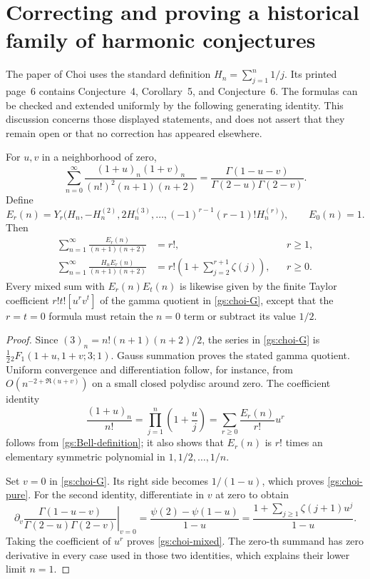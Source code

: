 \section{Correcting and proving a historical family of harmonic conjectures}
\label{gs:choi-section}

The paper of Choi \cite{gs:Choi} uses the standard definition
$H_n=\sum_{j=1}^n1/j$.  Its printed page~6 contains Conjecture~4,
Corollary~5, and Conjecture~6.  The formulas can be checked and extended
uniformly by the following generating identity.  This discussion
concerns those displayed statements, and does not assert that they
remain open or that no correction has appeared elsewhere.

\begin{theorem}
\label{gs:choi-master}
For $u,v$ in a neighborhood of zero,
\begin{equation}\label{gs:choi-G}
 \sum_{n=0}^{\infty}
 \frac{(1+u)_n(1+v)_n}{(n!)^2(n+1)(n+2)}
 =\frac{\Gamma(1-u-v)}{\Gamma(2-u)\Gamma(2-v)}.
\end{equation}
Define
\begin{equation}\label{gs:En}
 E_r(n)=Y_r\bigl(H_n,-H_n^{(2)},2H_n^{(3)},\ldots,
              (-1)^{r-1}(r-1)!H_n^{(r)}\bigr),\qquad E_0(n)=1.
\end{equation}
Then
\begin{align}
 \sum_{n=1}^{\infty}\frac{E_r(n)}{(n+1)(n+2)}
 &=r!,&&r\ge1,\label{gs:choi-pure}\\
 \sum_{n=1}^{\infty}\frac{H_nE_r(n)}{(n+1)(n+2)}
 &=r!\left(1+\sum_{j=2}^{r+1}\zeta(j)\right),&&r\ge0.
 \label{gs:choi-mixed}
\end{align}
Every mixed sum with $E_r(n)E_t(n)$ is likewise given by the finite
Taylor coefficient $r!t![u^rv^t]$ of the gamma quotient in
\eqref{gs:choi-G}, except that the $r=t=0$ formula must retain the
$n=0$ term or subtract its value $1/2$.
\end{theorem}

\begin{proof}
Since $(3)_n=n!(n+1)(n+2)/2$, the series in
\eqref{gs:choi-G} is
$\tfrac12{}_2F_1(1+u,1+v;3;1)$.
Gauss summation proves the stated gamma quotient.  Uniform convergence
and differentiation follow, for instance, from
$O(n^{-2+\Re(u+v)})$ on a small closed polydisc around zero.
The coefficient identity
\[
 \frac{(1+u)_n}{n!}
 =\prod_{j=1}^n\left(1+\frac uj\right)
 =\sum_{r\ge0}\frac{E_r(n)}{r!}u^r
\]
follows from \eqref{gs:Bell-definition}; it also shows that $E_r(n)$ is
$r!$ times an elementary symmetric polynomial in $1,1/2,\ldots,1/n$.

Set $v=0$ in \eqref{gs:choi-G}.  Its right side becomes $1/(1-u)$,
which proves \eqref{gs:choi-pure}.  For the second identity,
differentiate in $v$ at zero to obtain
\[
 \left.\partial_v
 \frac{\Gamma(1-u-v)}{\Gamma(2-u)\Gamma(2-v)}\right|_{v=0}
 =\frac{\psi(2)-\psi(1-u)}{1-u}
 =\frac{1+\sum_{j\ge1}\zeta(j+1)u^j}{1-u}.
\]
Taking the coefficient of $u^r$ proves \eqref{gs:choi-mixed}.
The zero-th summand has zero derivative in every case used in those
two identities, which explains their lower limit $n=1$.
\end{proof}

